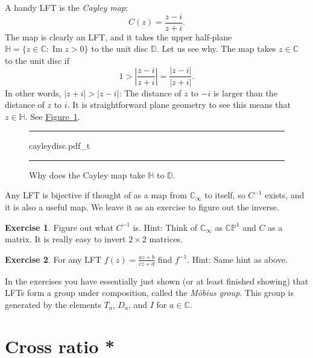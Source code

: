 \documentclass[12pt,openany]{book}
\renewcommand{\Im}{\operatorname{Im}}
\newcommand{\sabs}[1]{\lvert {#1} \rvert}
\newcommand{\abs}[1]{\left\lvert {#1} \right\rvert}
\newcommand{\C}{{\mathbb{C}}}
\newcommand{\D}{{\mathbb{D}}}
\newcommand{\bH}{{\mathbb{H}}}
\newcommand{\bP}{{\mathbb{P}}}
\newcommand{\myindex}[1]{#1\index{#1}}
\theoremstyle{plain}
\theoremstyle{remark}
\theoremstyle{definition}
\newenvironment{exbox}{%
    \def\FrameCommand{\vrule width 1pt \relax\hspace{10pt}}%
    \MakeFramed{\advance\hsize-\width\FrameRestore}%
}{%
    \endMakeFramed
}
\newenvironment{myfig}{%
\begin{figure}[h!t]
\noindent\rule{\textwidth}{0.4pt}\vspace{12pt}\par\centering}%
{\par\noindent\rule{\textwidth}{0.4pt}
\end{figure}}
\theoremstyle{exercise}
\newtheorem{exercise}{Exercise}[section]
\theoremstyle{example}
\newcommand{\figureref}[1]{\hyperref[#1]{Figure~\ref*{#1}}}
\begin{document}
\medskip

A handy LFT is the
\emph{\myindex{Cayley map}}:
\begin{equation*}
C(z)
=
\frac{z - i}{z + i} .
\end{equation*}
The map is clearly an LFT, and it
takes the upper half-plane $\bH = \{ z \in \C : \Im z > 0 \}$ to the
unit disc $\D$.  Let us see why.  The map takes $z \in \C$ to the unit disc if
\begin{equation*}
1 > \abs{\frac{z - i}{z + i} }
=
\frac{\sabs{z - i}}{\sabs{z + i}} .
\end{equation*}
In other words, $\sabs{z+i} > \sabs{z - i}$: The distance of $z$
to $-i$ is larger than the distance of $z$ to $i$.  It is straightforward
plane geometry to see this means that $z \in \bH$.  See
\figureref{fig:cayleydisc}.

\begin{myfig}
{cayleydisc.pdf_t}
\caption{Why does the Cayley map take $\bH$ to $\D$.\label{fig:cayleydisc}}
\end{myfig}

Any LFT is bijective if thought of as a map from $\C_\infty$
to itself, so $C^{-1}$ exists, and it is also a useful map.  We leave
it as an exercise to figure out the inverse.

\begin{exbox}
\begin{exercise}
Figure out what $C^{-1}$ is.  Hint: Think of $\C_\infty$ as $\C \bP^1$
and $C$ as a matrix.  It is really easy to invert $2 \times 2$ matrices.
\end{exercise}

\begin{exercise}
For any LFT $f(z) = \frac{az+b}{cz+d}$ find $f^{-1}$.
Hint: Same hint as above.
\end{exercise}
\end{exbox}

In the exercises you have essentially just shown (or at least finished
showing) that LFTs form a group under composition,
called the \emph{\myindex{M\"obius group}}.
This group is generated by the elements
$T_a$, $D_a$, and $I$ for $a\in \C$.


\section{Cross ratio *}
\end{document}
